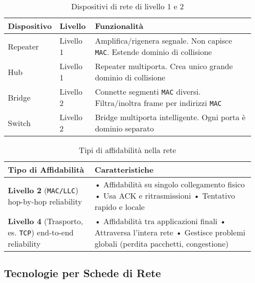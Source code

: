 \begin{table}[H]
\centering
\begin{tabular}{|p{3cm}|p{3cm}|p{9cm}|}
\hline
\rowcolor{bg_custom} \textbf{Dispositivo} & \textbf{Livello} & \textbf{Funzionalità} \\
\hline
Repeater & Livello 1 & Amplifica/rigenera segnale. Non capisce \texttt{MAC}. Estende dominio di collisione \\
\hline
Hub & Livello 1 & Repeater multiporta. Crea unico grande dominio di collisione \\
\hline
Bridge & Livello 2 & Connette segmenti \texttt{MAC} diversi. Filtra/inoltra frame per indirizzi \texttt{MAC} \\
\hline
Switch & Livello 2 & Bridge multiporta intelligente. Ogni porta è dominio separato \\
\hline
\end{tabular}
\caption{Dispositivi di rete di livello 1 e 2}
\end{table}

\begin{table}[H]
\centering
\begin{tabular}{|p{4cm}|p{11cm}|}
\hline
\rowcolor{bg_custom} \textbf{Tipo di Affidabilità} & \textbf{Caratteristiche} \\
\hline
\textbf{Livello 2} \newline (\texttt{MAC/LLC}) \newline hop-by-hop reliability & 
• Affidabilità su singolo collegamento fisico \newline
• Usa ACK e ritrasmissioni \newline
• Tentativo rapido e locale \\
\hline
\textbf{Livello 4} \newline (Trasporto, es. \texttt{TCP}) \newline end-to-end reliability & 
• Affidabilità tra applicazioni finali \newline
• Attraversa l'intera rete \newline
• Gestisce problemi globali (perdita pacchetti, congestione) \\
\hline
\end{tabular}
\caption{Tipi di affidabilità nella rete}
\end{table}

\subsection{Tecnologie per Schede di Rete}

